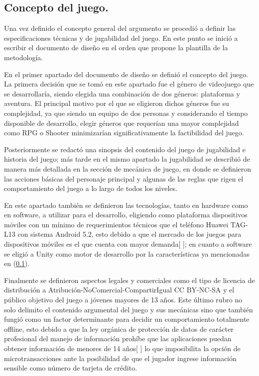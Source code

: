 \subsection{Concepto del juego.}
Una vez definido el concepto general del argumento se procedió a definir las especificaciones técnicas y de jugabilidad del juego. En este punto se inició a escribir el documento de diseño en el orden que propone la plantilla de la metodología. 
\\
\par
En el primer apartado del documento de diseño se definió el concepto del juego. La primera decisión que se tomó en este apartado fue el género de videojuego que se desarrollaría, siendo elegida una combinación de dos géneros: plataforma y aventura. El principal motivo por el que se eligieron dichos géneros fue su complejidad, ya que siendo un equipo de dos personas y considerando el tiempo disponible de desarrollo, elegir géneros que requerían una mayor complejidad como RPG o Shooter minimizarían significativamente la factibilidad del juego.  
\\
\par
Posteriormente se redactó una sinopsis del contenido del juego de jugabilidad e historia del juego; más tarde en el mismo apartado la jugabilidad se describió de manera más detallada en la sección de mecánica de juego, en donde se definieron las acciones básicas del personaje principal y algunas de las reglas que rigen el comportamiento del juego a lo largo de todos los niveles. 
\\
\par
En este apartado también se definieron las tecnologías, tanto en hardware como en software, a utilizar para el desarrollo, eligiendo como plataforma dispositivos móviles con un mínimo de requerimientos técnicos que el teléfono Huawei TAG-L13 con sistema Android 5.2, esto debido a que el mercado de los juegos para dispositivos móviles es el que cuenta con mayor demanda[ ]; en cuanto a software se eligió a Unity como motor de desarrollo por la características ya mencionadas en (\ref{}). 
\\
\par
Finalmente se definieron aspectos legales y comerciales como el tipo de licencia de distribución a Atribución-NoComercial-CompartirIgual CC BY-NC-SA y el público objetivo del juego a jóvenes mayores de 13 años. Este último rubro no solo delimito el contenido argumental del juego y sus mecánicas sino que también fungió como un factor determinante para decidir un comportamiento totalmente offline, esto debido a que la ley orgánica de protección de datos de carácter profesional del manejo de información prohíbe que las aplicaciones puedan obtener información de menores de 14 años[ ] lo que imposibilita la opción de microtransacciones ante la posibilidad de que el jugador ingrese información sensible como número de tarjeta de crédito. 

